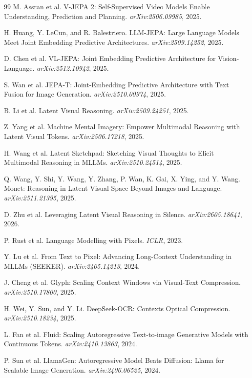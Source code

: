 \documentclass[11pt,a4paper]{article}
\begin{document}
\begin{thebibliography}{99}
 M. Assran et al. V-JEPA 2: Self-Supervised Video Models Enable Understanding, Prediction and Planning. \emph{arXiv:2506.09985}, 2025.

 H. Huang, Y. LeCun, and R. Balestriero. LLM-JEPA: Large Language Models Meet Joint Embedding Predictive Architectures. \emph{arXiv:2509.14252}, 2025.

 D. Chen et al. VL-JEPA: Joint Embedding Predictive Architecture for Vision-Language. \emph{arXiv:2512.10942}, 2025.

 S. Wan et al. JEPA-T: Joint-Embedding Predictive Architecture with Text Fusion for Image Generation. \emph{arXiv:2510.00974}, 2025.

 B. Li et al. Latent Visual Reasoning. \emph{arXiv:2509.24251}, 2025.

 Z. Yang et al. Machine Mental Imagery: Empower Multimodal Reasoning with Latent Visual Tokens. \emph{arXiv:2506.17218}, 2025.

 H. Wang et al. Latent Sketchpad: Sketching Visual Thoughts to Elicit Multimodal Reasoning in MLLMs. \emph{arXiv:2510.24514}, 2025.

 Q. Wang, Y. Shi, Y. Wang, Y. Zhang, P. Wan, K. Gai, X. Ying, and Y. Wang. Monet: Reasoning in Latent Visual Space Beyond Images and Language. \emph{arXiv:2511.21395}, 2025.

 D. Zhu et al. Leveraging Latent Visual Reasoning in Silence. \emph{arXiv:2605.18641}, 2026.

 P. Rust et al. Language Modelling with Pixels. \emph{ICLR}, 2023.

 Y. Lu et al. From Text to Pixel: Advancing Long-Context Understanding in MLLMs (SEEKER). \emph{arXiv:2405.14213}, 2024.

 J. Cheng et al. Glyph: Scaling Context Windows via Visual-Text Compression. \emph{arXiv:2510.17800}, 2025.

 H. Wei, Y. Sun, and Y. Li. DeepSeek-OCR: Contexts Optical Compression. \emph{arXiv:2510.18234}, 2025.

 L. Fan et al. Fluid: Scaling Autoregressive Text-to-image Generative Models with Continuous Tokens. \emph{arXiv:2410.13863}, 2024.

 P. Sun et al. LlamaGen: Autoregressive Model Beats Diffusion: Llama for Scalable Image Generation. \emph{arXiv:2406.06525}, 2024.


\end{thebibliography}
\end{document}
